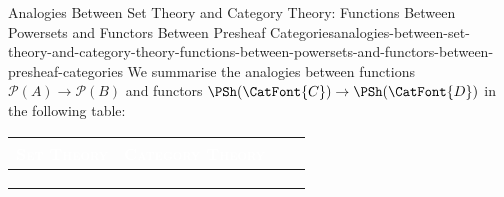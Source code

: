 \begin{remark}{Analogies Between Set Theory and Category Theory: Functions Between Powersets and Functors Between Presheaf Categories}{analogies-between-set-theory-and-category-theory-functions-between-powersets-and-functors-between-presheaf-categories}%
    We summarise the analogies between functions $\mathcal{P}(A)\to\mathcal{P}(B)$ and functors $\PSh(\CatFont{C})\to\PSh(\CatFont{D})$ in the following table:
    \begingroup%
    \setlength\cellspacetoplimit{3pt}
    \setlength\cellspacebottomlimit{3pt}
    \renewcommand{\arraystretch}{1.2}
    \begin{center}
        \begin{tabular}{|Sc|Sc|}\hline{}
            \textcolor{white}{\textbf{\textsc{Set Theory}}}                                                                       & \textcolor{white}{\textbf{\textsc{Category Theory}}}                                                                                \\\hline{}
                                   &                      \\
                                 &                        \\
             &  \\\hline
        \end{tabular}
    \end{center}
    \endgroup
\end{remark}
